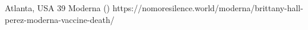           {Atlanta, USA}
          {39}
          {Moderna}
          {}
          { ()}
          {https://nomoresilence.world/moderna/brittany-hall-perez-moderna-vaccine-death/}

